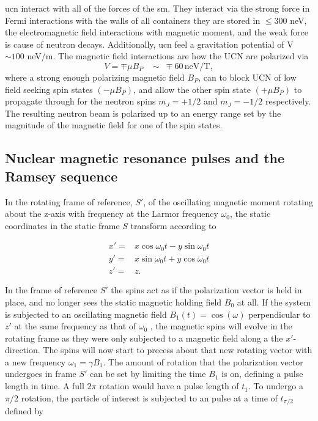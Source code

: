 \Gls{ucn} interact with all of the forces of the \gls{sm}. They interact via the strong force in Fermi interactions with the walls of all containers they are stored in $\leq 300$ neV, the electromagnetic field interactions with magnetic moment, and the weak force is cause of neutron decays. Additionally, \gls{ucn} feel a gravitation potential of V $\sim 100$ neV/m. The magnetic field interactions are how the UCN are polarized via
\begin{equation}
    V = \mp \mu B_P \; \; \; \sim \;\mp60 \,\textrm{neV/T},
\end{equation}
where a strong enough polarizing magnetic field $B_P$, can to block UCN of low field seeking spin states $(-\mu B_P)$, and allow the other spin state $(+\mu B_P)$ to propagate through for the neutron spins $m_J=+1/2$ and $m_J=-1/2$ respectively.  The resulting neutron beam is polarized up to an energy range set by the magnitude of the magnetic field for one of the spin states. 

\subsection{Nuclear magnetic resonance pulses and the Ramsey sequence}

In the rotating frame of reference, $S'$, of the oscillating magnetic moment rotating about the z-axis with frequency at the Larmor frequency $\omega_0$, the static coordinates in the static frame $S$ transform according to

\begin{equation}
    \begin{split}
        x' =& x \cos{ \omega_0 t} - y \sin{\omega_0 t}\\
        y' =& x \sin{\omega_0 t} + y \cos{\omega_0 t}\\
        z' =& z.
    \end{split}
\end{equation}

In the frame of reference $S'$ the spins act as if the polarization vector is held in place, and no longer sees the static  magnetic holding field $B_0$ at all. If the system is subjected to an oscillating magnetic field $B_1(t)=\cos{(\omega)}$ perpendicular to $z'$ at the same frequency as that of $\omega_0$ , the magnetic spins will evolve in the rotating frame as they were only subjected to a magnetic field along a the $x'$-direction. The spins will now start to precess about that new rotating vector  with a new frequency $\omega_1 = \gamma B_1$. The amount of rotation that the polarization vector undergoes in frame $S'$ can be set by limiting the time $B_1$ is on, defining a pulse length in time. A full $2\pi$ rotation would have a pulse length of $t_1$. To undergo a $\pi/2$ rotation, the particle of interest is subjected to an pulse at a time of $t_{\pi/2}$ defined by

